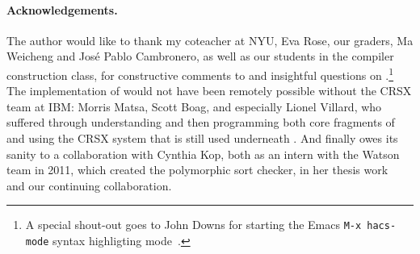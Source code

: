 \documentclass[letterpaper]{llncs}
\begin{document}
\paragraph*{Acknowledgements.} The author would like to thank my coteacher at NYU, Eva Rose, our
graders, Ma Weicheng and José Pablo Cambronero, as well as our students in the compiler construction
class, for constructive comments to and insightful questions on \HAX.\footnote{A special shout-out
  goes to John Downs for starting the Emacs \texttt{M-x hacs-mode} syntax highligting
  mode~\cite{git:hacsel}.}
The implementation of \HAX would not have been remotely possible without the CRSX team at IBM:
Morris Matsa, Scott Boag, and especially Lionel Villard, who suffered through understanding and then
programming both core fragments of and using the CRSX system that is still used underneath \HAX.
And finally \HAX owes its sanity to a collaboration with Cynthia Kop, both as an intern with the
Watson team in 2011, which created the polymorphic sort checker, in her thesis work~\cite{Kop:2012}
and our continuing collaboration.




\end{document}
